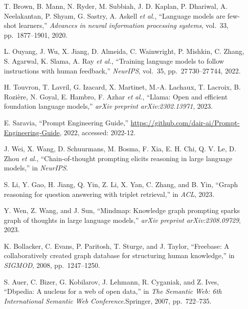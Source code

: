 \begin{enumerate}[leftmargin=2em,label={[\arabic*]}]
\item T. Brown, B. Mann, N. Ryder, M. Subbiah, J. D. Kaplan, P. Dhariwal, A. Neelakantan, P. Shyam, G. Sastry, A. Askell \textit{et al.}, ``Language models are few-shot learners,'' \textit{Advances in neural information processing systems}, vol.~33, pp.~1877--1901, 2020.

\item L. Ouyang, J. Wu, X. Jiang, D. Almeida, C. Wainwright, P. Mishkin, C. Zhang, S. Agarwal, K. Slama, A. Ray \textit{et al.}, ``Training language models to follow instructions with human feedback,'' \textit{NeurIPS}, vol.~35, pp.~27\,730--27\,744, 2022.

\item H. Touvron, T. Lavril, G. Izacard, X. Martinet, M.-A. Lachaux, T. Lacroix, B. Rozi\`{e}re, N. Goyal, E. Hambro, F. Azhar \textit{et al.}, ``Llama: Open and efficient foundation language models,'' \textit{arXiv preprint arXiv:2302.13971}, 2023.

\item E. Saravia, ``Prompt Engineering Guide,'' \url{https://github.com/dair-ai/Prompt-Engineering-Guide}, 2022, accessed: 2022-12.

\item J. Wei, X. Wang, D. Schuurmans, M. Bosma, F. Xia, E. H. Chi, Q. V. Le, D. Zhou \textit{et al.}, ``Chain-of-thought prompting elicits reasoning in large language models,'' in \textit{NeurIPS}.

\item S. Li, Y. Gao, H. Jiang, Q. Yin, Z. Li, X. Yan, C. Zhang, and B. Yin, ``Graph reasoning for question answering with triplet retrieval,'' in \textit{ACL}, 2023.

\item Y. Wen, Z. Wang, and J. Sun, ``Mindmap: Knowledge graph prompting sparks graph of thoughts in large language models,'' \textit{arXiv preprint arXiv:2308.09729}, 2023.

\item K. Bollacker, C. Evans, P. Paritosh, T. Sturge, and J. Taylor, ``Freebase: A collaboratively created graph database for structuring human knowledge,'' in \textit{SIGMOD}, 2008, pp.~1247--1250.

\item S. Auer, C. Bizer, G. Kobilarov, J. Lehmann, R. Cyganiak, and Z. Ives, ``Dbpedia: A nucleus for a web of open data,'' in \textit{The Semantic Web: 6th International Semantic Web Conference}.\quad Springer, 2007, pp.~722--735.


\end{enumerate}
